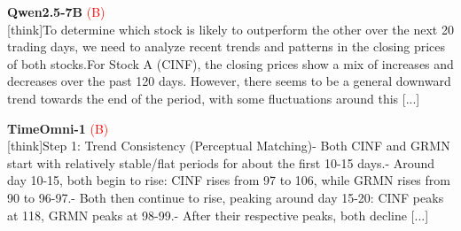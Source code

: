 \noindent
\begin{minipage}[t]{0.28\textwidth}
\colorbox{red!8}{\parbox{\dimexpr\textwidth-2\fboxsep}{
\textbf{Qwen2.5-7B} \textcolor{red}{(B)} \\[2pt]
\tiny
[think]To determine which stock is likely to outperform the other over the next 20 trading days, we need to analyze recent trends and patterns in the closing prices of both stocks.\newline For Stock A (CINF), the closing prices show a mix of increases and decreases over the past 120 days. However, there seems to be a general downward trend towards the end of the period, with some fluctuations around this  [...]
}}
\end{minipage}
\hfill
\begin{minipage}[t]{0.28\textwidth}
\colorbox{red!8}{\parbox{\dimexpr\textwidth-2\fboxsep}{
\textbf{TimeOmni-1} \textcolor{red}{(B)} \\[2pt]
\tiny
[think]\newline Step 1: Trend Consistency (Perceptual Matching)\newline - Both CINF and GRMN start with relatively stable/flat periods for about the first 10-15 days.\newline - Around day 10-15, both begin to rise: CINF rises from  97 to  106, while GRMN rises from  90 to  96-97.\newline - Both then continue to rise, peaking around day 15-20: CINF peaks at  118, GRMN peaks at  98-99.\newline - After their respective peaks, both decline  [...]
}}
\end{minipage}
\hfill
